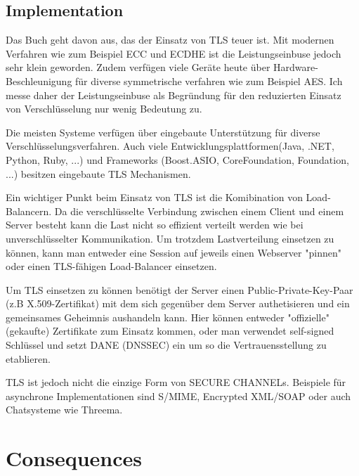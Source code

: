 \subsection{Implementation}

\begin{caveat}[Performance]
  Das Buch geht davon aus, das der Einsatz von TLS teuer ist. Mit modernen Verfahren wie zum Beispiel ECC und ECDHE ist die Leistungseinbuse jedoch sehr klein geworden. Zudem verfügen viele Geräte heute über Hardware-Beschleunigung für diverse symmetrische verfahren wie zum Beispiel AES. Ich messe daher der Leistungseinbuse als Begründung für den reduzierten Einsatz von Verschlüsselung nur wenig Bedeutung zu.
\end{caveat}

Die meisten Systeme verfügen über eingebaute Unterstützung für diverse Verschlüsselungsverfahren. Auch viele Entwicklungsplattformen(Java, .NET, Python, Ruby, ...) und Frameworks (Boost.ASIO, CoreFoundation, Foundation, ...) besitzen eingebaute TLS Mechanismen.

Ein wichtiger Punkt beim Einsatz von TLS ist die Komibination von Load-Balancern. Da die verschlüsselte Verbindung zwischen einem Client und einem Server besteht kann die Last nicht so effizient verteilt werden wie bei unverschlüsselter Kommunikation. Um trotzdem Lastverteilung einsetzen zu können, kann man entweder eine Session auf jeweils einen Webserver "pinnen" oder einen TLS-fähigen Load-Balancer einsetzen.

Um TLS einsetzen zu können benötigt der Server einen Public-Private-Key-Paar (z.B X.509-Zertifikat) mit dem sich gegenüber dem Server authetisieren und ein gemeinsames Geheimnis aushandeln kann. Hier können entweder "offizielle" (gekaufte) Zertifikate zum Einsatz kommen, oder man verwendet self-signed Schlüssel und setzt DANE (DNSSEC) ein um so die Vertrauensstellung zu etablieren.

TLS ist jedoch nicht die einzige Form von SECURE CHANNELs. Beispiele für asynchrone Implementationen sind S/MIME, Encrypted XML/SOAP oder auch Chatsysteme wie Threema.

\section{Consequences}
\begin{samepage}
\begin{itemize}
\end{itemize}
\end{samepage}

